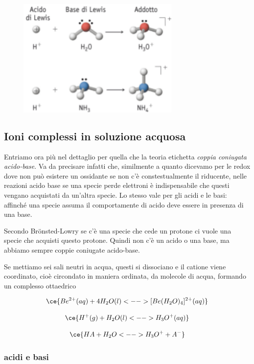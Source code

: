 \begin{figure}[htp]
    \centering
    \includegraphics[width=8cm]{immagini/acidi_e_basi_di_lewis.png}
\end{figure}

\subsection{Ioni complessi in soluzione acquosa}
Entriamo ora più nel dettaglio per quella che la teoria etichetta \textit{coppia coniugata acido-base}. Va da precisare infatti che, similmente a quanto dicevamo per le redox dove non può esistere un ossidante se non c'è constestualmente il riducente, nelle reazioni acido base se una specie perde elettroni è indispensabile che questi vengano acquistati da un'altra specie. Lo stesso vale per gli acidi e le basi: affinché una specie assuma il comportamente di acido deve essere in presenza di una base.

Secondo Br\"{o}nsted-Lowry se c'è una specie che cede un protone ci vuole una specie che acquisti questo protone. Quindi non c'è un acido o una base, ma abbiamo sempre coppie coniugate acido-base.

\vspace{0.2cm}Se mettiamo sei sali neutri in acqua, questi si dissociano e il catione viene coordinato, cioè circondato in maniera ordinata, da molecole di acqua, formando un complesso ottaedrico

$$\ce{Be^{2+}(aq) + 4H_2O(l) <--> [Be(H_2O)_4]^{2+}(aq)}$$

$$\ce{H^+(g) + H_2O(l) <--> H_3O^+(aq)}$$

$$\ce{HA + H_2O <--> H_3O^+ + A^-}$$

\subsubsection{acidi e basi}

\vspace{0.2cm}

